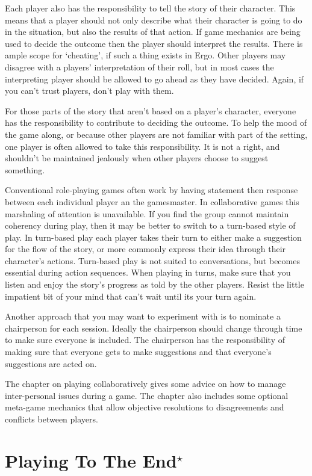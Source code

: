 \documentclass[twoside]{book}
\begin{document}
Each player also has the responsibility to tell the story of their
character. This means that a player should not only describe what
their character is going to do in the situation, but also the results
of that action. If game mechanics are being used to decide the outcome
then the player should interpret the results. There is ample scope for
`cheating', if such a thing exists in Ergo. Other players may disagree
with a players' interpretation of their roll, but in most cases the
interpreting player should be allowed to go ahead as they have
decided. Again, if you can't trust players, don't play with them.

For those parts of the story that aren't based on a player's
character, everyone has the responsibility to contribute to deciding
the outcome. To help the mood of the game along, or because other
players are not familiar with part of the setting, one player is often
allowed to take this responsibility. It is not a right, and shouldn't
be maintained jealously when other players choose to suggest
something.

Conventional role-playing games often work by having statement then
response between each individual player an the gamesmaster. In
collaborative games this marshaling of attention is unavailable. If
you find the group cannot maintain coherency during play, then it may
be better to switch to a turn-based style of play. In turn-based play
each player takes their turn to either make a suggestion for the flow
of the story, or more commonly express their idea through their
character's actions. Turn-based play is not suited to conversations,
but becomes essential during action sequences. When playing in turns,
make sure that you listen and enjoy the story's progress as told by
the other players. Resist the little impatient bit of your mind that
can't wait until its your turn again.

Another approach that you may want to experiment with is to nominate a
chairperson for each session. Ideally the chairperson should change
through time to make sure everyone is included. The chairperson has
the responsibility of making sure that everyone gets to make
suggestions and that everyone's suggestions are acted on.

The chapter on playing collaboratively gives some advice on how to
manage inter-personal issues during a game. The chapter also includes
some optional meta-game mechanics that allow objective resolutions to
disagreements and conflicts between players.

\section{Playing To The End$^\star$} %
\end{document}
